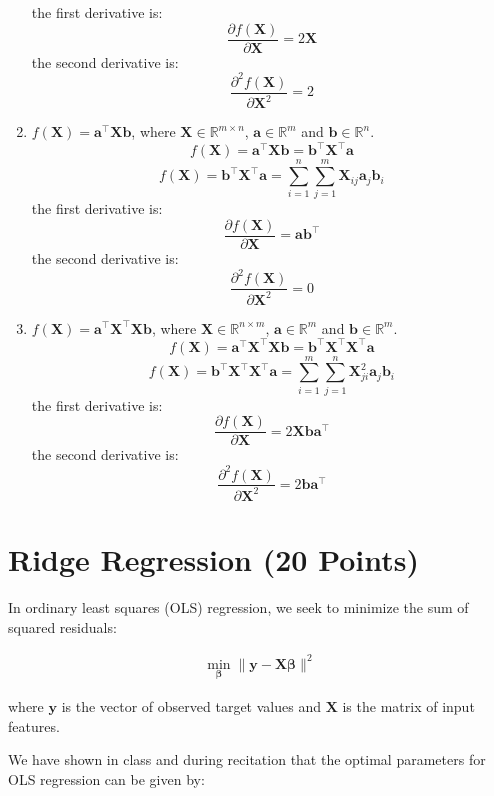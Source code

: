 \documentclass{article}
\begin{document}
\begin{enumerate}
\[    \]
    the first derivative is:
    \[
    \frac{\partial f(\mathbf{X})}{\partial \mathbf{X}} = 2 \mathbf{X}
    \]
    the second derivative is:
    \[
    \frac{\partial^2 f(\mathbf{X})}{\partial \mathbf{X}^2} = 2
    \]
    \item $f(\mathbf{X}) = \mathbf{a}^\top \mathbf{X} \mathbf{b}$, where $\mathbf{X} \in \mathbb{R}^{m \times n}$, $\mathbf{a} \in \mathbb{R}^m$ and $\mathbf{b} \in \mathbb{R}^n$.
    \[
    f(\mathbf{X}) = \mathbf{a}^\top \mathbf{X} \mathbf{b} = \mathbf{b}^\top \mathbf{X}^\top \mathbf{a}
    \]
    \[
    f(\mathbf{X}) = \mathbf{b}^\top \mathbf{X}^\top \mathbf{a} = \sum_{i=1}^{n} \sum_{j=1}^{m} \mathbf{X}_{ij} \mathbf{a}_j \mathbf{b}_i
    \]
    the first derivative is:
    \[
    \frac{\partial f(\mathbf{X})}{\partial \mathbf{X}} = \mathbf{a} \mathbf{b}^\top
    \]
    the second derivative is:
    \[
    \frac{\partial^2 f(\mathbf{X})}{\partial \mathbf{X}^2} = 0
    \]
    \item $f(\mathbf{X}) = \mathbf{a}^\top \mathbf{X}^\top \mathbf{X} \mathbf{b}$, where $\mathbf{X} \in \mathbb{R}^{n \times m}$, $\mathbf{a} \in \mathbb{R}^m$ and $\mathbf{b} \in \mathbb{R}^m$.
    \[
    f(\mathbf{X}) = \mathbf{a}^\top \mathbf{X}^\top \mathbf{X} \mathbf{b} = \mathbf{b}^\top \mathbf{X}^\top \mathbf{X}^\top \mathbf{a}
    \]
    \[
    f(\mathbf{X}) = \mathbf{b}^\top \mathbf{X}^\top \mathbf{X}^\top \mathbf{a} = \sum_{i=1}^{m} \sum_{j=1}^{n} \mathbf{X}_{ji}^2 \mathbf{a}_j \mathbf{b}_i
    \]
    the first derivative is:
    \[
    \frac{\partial f(\mathbf{X})}{\partial \mathbf{X}} = 2 \mathbf{X} \mathbf{b} \mathbf{a}^\top
    \]
    the second derivative is:
    \[
    \frac{\partial^2 f(\mathbf{X})}{\partial \mathbf{X}^2} = 2 \mathbf{b} \mathbf{a}^\top
    \]
\end{enumerate}

\section{Ridge Regression (20 Points)}
In ordinary least squares (OLS) regression, we seek to minimize the sum of squared residuals:

\begin{align}
\min_{\boldsymbol{\beta}} \|\mathbf{y} - \mathbf{X} \boldsymbol{\beta} \|^2
\end{align}

where $\mathbf{y}$ is the vector of observed target values and $\mathbf{X}$ is the matrix of input features.

We have shown in class and during recitation that the optimal parameters for OLS regression can be given by:
\end{document}
